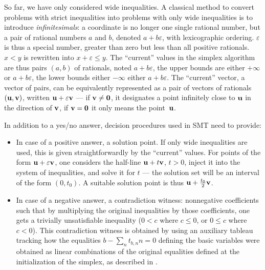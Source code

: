 So far, we have only considered wide inequalities.
A classical method to convert problems with strict inequalities into problems with only wide inequalities is to introduce \emph{infinitesimals}: a coordinate is no longer one single rational number, but a pair of rational numbers $a$ and $b$, denoted $a+b\varepsilon$, with lexicographic ordering. $\varepsilon$ is thus a special number, greater than zero but less than all positive rationals. $x < y$ is rewritten into $x + \varepsilon \leq y$. The ``current'' values in the simplex algorithm are thus pairs $(a,b)$ of rationals, noted $a+b\varepsilon$, the upper bounds are either $+\infty$ or $a+b\varepsilon$, the lower bounds either $-\infty$ either $a+b\varepsilon$. The ``current'' vector, a vector of pairs, can be equivalently represented as a pair of vectors of rationals $(\mathbf{u},\mathbf{v})$, written $\mathbf{u}+\varepsilon \mathbf{v}$ --- if $\mathbf{v} \neq \mathbf{0}$, it designates a point infinitely close to $\mathbf{u}$ in the direction of $\mathbf{v}$, if $\mathbf{v} = \mathbf{0}$ it only means the point~$\mathbf{u}$.

In addition to a yes/no answer, decision procedures used in SMT need to provide:
\begin{itemize}
\item In case of a positive answer, a solution point. If only wide inequalities are used, this is given straightforwardly by the ``current'' values. For points of the form $\mathbf{u}+\varepsilon \mathbf{v}$, one considers the half-line $\mathbf{u}+t\mathbf{v}$, $t > 0$, inject it into the system of inequalities, and solve it for $t$ --- the solution set will be an interval of the form $(0,t_0)$. A suitable solution point is thus $\mathbf{u}+\frac{t_0}{2} \mathbf{v}$.

\item In case of a negative answer, a contradiction witness: nonnegative coefficients such that by multiplying the original inequalities by those coefficients, one gets a trivially unsatisfiable inequality ($0 < c$ where $c \leq 0$, or $0 \leq c$ where $c < 0$). This contradiction witness is obtained by using an auxiliary tableau tracking how the equalities $b - \sum_n t_{b,n} n = 0$ defining the basic variables were obtained as linear combinations of the original equalities defined at the initialization of the simplex, as described in \cite[Sec.~3.2.2]{SRI-CSL-06-01}.
\end{itemize}

